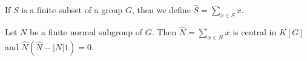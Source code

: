 \begin{graybox}
%

%

If $S$ is a finite subset of a group $G$, then we define 
$\widehat{S}=\sum_{x\in S}x$. 

\begin{lemma}
	\label{lemma:sumN}
	Let $N$ be a finite normal subgroup of $G$. Then $\widehat{N}=\sum_{x\in N}x$ is central
	in $K[G]$ and $\widehat{N}(\widehat{N}-|N|1)=0$.
\end{lemma}


\end{graybox}
